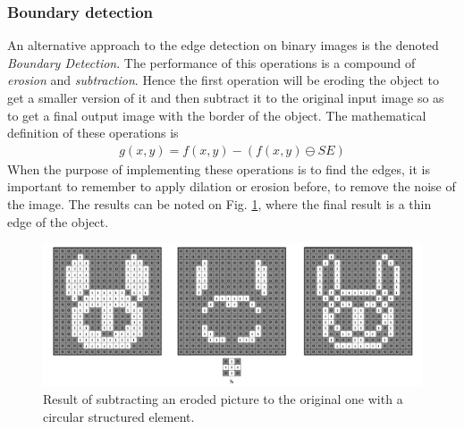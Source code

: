 \subsubsection{Boundary detection}
An alternative approach to the edge detection on binary images is the denoted \textit{Boundary Detection}. The performance of this operations is a compound of \textit{erosion} and \textit{subtraction}. Hence the first operation will be eroding the object to get a smaller version of it and then subtract it to the original input image so as to get a final output image with the border of the object. The mathematical definition of these operations is
\begin{equation}
\begin{aligned}
{g(x,y)}={f(x,y)}-({f(x,y)}\ominus{SE})
\label{BoundDetec}
	\end{aligned}
\end{equation}
When the purpose of implementing these operations is to find the edges, it is important to remember to apply dilation or erosion before, to remove the noise of the image. The results can be noted on Fig. \ref{fig:Boundary}, where the final result is a thin edge of the object.

\begin{figure}[htbp]
\centering
\includegraphics[width=1\textwidth]{Pictures/Theory/BoundaryEdges_circ.png}
\caption{Result of subtracting an eroded picture to the original one with a circular structured element.}
\label{fig:Boundary}
\end{figure}

